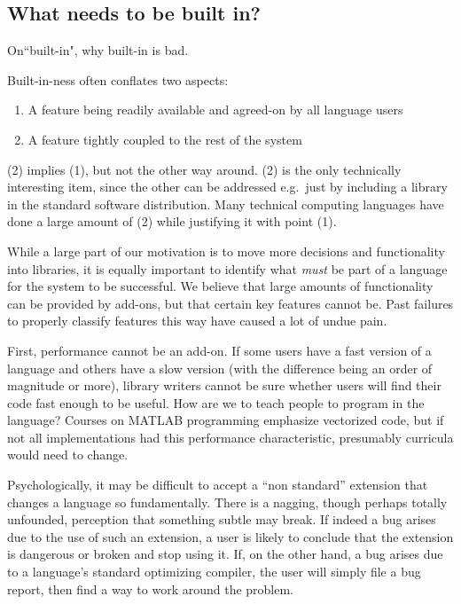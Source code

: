 {\subsection{What needs to be built in?}

On``built-in", why built-in is bad.

Built-in-ness often conflates two aspects:

\begin{enumerate}
\item A feature being readily available and agreed-on by all language users
\item A feature tightly coupled to the rest of the system
\end{enumerate}

(2) implies (1), but not the other way around. (2) is the only technically
interesting item, since the other can be addressed e.g.\  just by including
a library in the standard software distribution. Many technical computing
languages have done a large amount of (2) while justifying it with point (1).


While a large part of our motivation is to move more decisions and functionality
into libraries, it is equally important to identify what {\it  must} be part of a
language for the system to be successful. We believe that large amounts of
functionality can be provided by add-ons, but that certain key features
cannot be. Past failures to properly classify features this way have
caused a lot of undue pain.

First, performance cannot be an add-on. If some users have a fast version of
a language and others have a slow version (with the difference being an
order of magnitude or more), library writers cannot be sure whether users
will find their code fast enough to be useful. How are we to teach people to
program in the language? Courses on MATLAB programming emphasize vectorized code,
but if not all implementations had this performance characteristic,
presumably curricula would need to change.

Psychologically, it may be difficult to accept a ``non standard'' extension
that changes a language so fundamentally. There is a nagging, though perhaps
totally unfounded, perception that something subtle may break. If indeed a
bug arises due to the use of such an extension, a user is likely to conclude
that the extension is dangerous or broken and stop using it. If, on the other
hand, a bug arises due to a language's standard optimizing compiler, the user
will simply file a bug report, then find a way to work around the problem.

}
